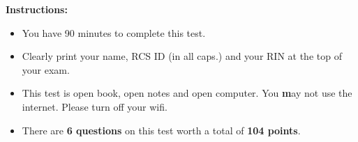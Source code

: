 \documentclass[10pt]{article}
\begin{document}
\vspace*{.45in} 

{\large\bf Instructions:}
\begin{itemize}
\item You have 90 minutes to complete this test.
\item Clearly print your name, RCS ID (in all caps.) and your RIN at the top of your exam.
\item This test is open book, open notes and open computer. You {\textbf may not} use the internet. Please turn off your wifi.
\item There are \textbf{6 questions} on this test worth a total of
  \textbf{104 points}.
\end{itemize}


\newpage

\fi
\end{document}
